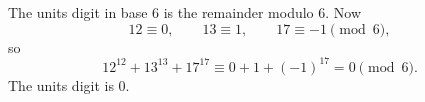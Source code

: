 The units digit in base $6$ is the remainder modulo $6$. Now
\[
12\equiv0,\qquad 13\equiv1,\qquad 17\equiv-1\pmod6 ,
\]
so
\[
12^{12}+13^{13}+17^{17}\equiv0+1+(-1)^{17}=0\pmod6 .
\]
The units digit is $\boxed{0}$.
